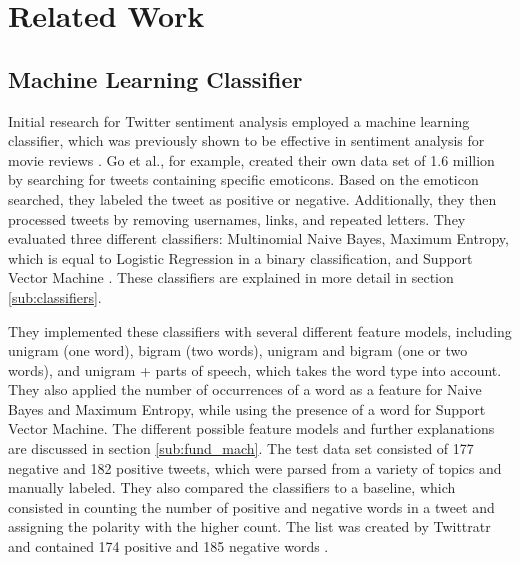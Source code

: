\chapter{Related Work}
\label{cha:Chapter2_RelatedWork}
\iffalse

Length: 1-2 pages

Effort: ~2 weeks

2-3 Arbeiten maximal, die genauer betrachtet werden
Ruhig mehr Zitate --> aber nicht detailliert betrachten
Introduction to Data Mining --> zu generell, nur als Zitat
Hier nur im engsten Sinne


Content
\begin{itemize}
\item Alec Go, Richa Bhayani, and Lei Huang. 2009. Twitter Sentiment Classification Using Distant Supeusedrvision.
Technical Report. Standford.
\item Taboada or Serendio or Vader?
\item Khuc et al.
\end{itemize}

\fi



\section{Machine Learning Classifier}
\label{sub:related_ml}
Initial research for Twitter sentiment analysis employed a machine learning classifier, which was previously shown to be effective in sentiment analysis for movie reviews \cite{GoBHaHua2009}. Go et al., for example, created their own data set of 1.6 million by searching for tweets containing specific emoticons. Based on the emoticon searched, they labeled the tweet as positive or negative. Additionally, they then processed tweets by removing usernames, links, and repeated letters. They evaluated three different classifiers: Multinomial Naive Bayes, Maximum Entropy, which is equal to Logistic Regression in a binary classification, and Support Vector Machine \cite{GoBHaHua2009}. These classifiers are explained in more detail in section \ref{sub:classifiers}.

They implemented these classifiers with several different feature models, including unigram (one word), bigram (two words), unigram and bigram (one or two words), and unigram + parts of speech, which takes the word type into account. They also applied the number of occurrences of a word as a feature for Naive Bayes and Maximum Entropy, while using the presence of a word for Support Vector Machine. The different possible feature models and further explanations are discussed in section \ref{sub:fund_mach}. The test data set consisted of 177 negative and 182 positive tweets, which were parsed from a variety of topics and manually labeled. They also compared the classifiers to a baseline, which consisted in counting the number of positive and negative words in a tweet and assigning the polarity with the higher count. The list was created by Twittratr and contained 174 positive and 185 negative words \cite{GoBHaHua2009}. 

